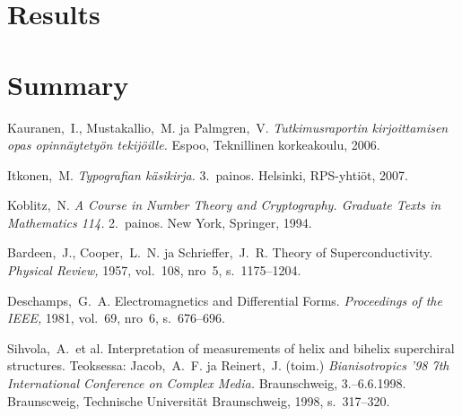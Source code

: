 \documentclass[english, 12pt, a4paper, elec, utf8, a-1b, online]{aaltothesis}
\begin{document}
\section{Results}

\clearpage
\section{Summary} 

\clearpage
\thesisbibliography
\begin{thebibliography}{99}

 Kauranen,\ I., Mustakallio,\ M. ja Palmgren,\ V.
  \textit{Tutkimusraportin kirjoittamisen opas opinn\"aytety\"on
    tekij\"oille.}  Espoo, Teknillinen korkeakoulu, 2006.

 Itkonen,\ M. \textit{Typografian k\"asikirja.} 3.\
  painos.  Helsinki, RPS-yhti\"ot, 2007.

 Koblitz,\ N. \textit{A Course in Number Theory and
    Cryptography. Graduate Texts in Mathematics 114.}  2.\ painos. New
  York, Springer, 1994.

\bibitem{bcs} Bardeen,\ J., Cooper,\ L.\ N. ja Schrieffer,\ J.\ R.
  Theory of Superconductivity. \textit{Physical Review,} 1957, vol.\
  108, nro~5, s.\ 1175--1204.

 Deschamps,\ G.\ A. Electromagnetics and
  Differential Forms. \textit{Proceedings of the IEEE,} 1981, vol.\
  69, nro~6, s.\ 676--696.

\bibitem{Sihvola} Sihvola,\ A.\ et al.
  \foreignlanguage{english}{Interpretation of measurements of helix 
    and bihelix superchiral structures.}
  Teoksessa: Jacob,\ A.\ F. ja
  Reinert,\ J. (toim.) \textit{Bianisotropics '98 7th International
    Conference on Complex Media.}  Braunschweig, 3.--6.6.1998.
  Braunscweig, Technische Universit\"at Braunschweig, 1998, s.\
  317--320.


\end{thebibliography}
\end{document}
